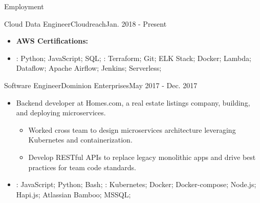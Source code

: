 \documentclass[]{mcdowellcv}
\begin{document}
\begin{cvsection}{Employment}
\begin{cvsubsection}{Cloud Data Engineer}{Cloudreach}{Jan. 2018 - Present}
\begin{itemize}
\begin{itemize}
                        \item \bf{AWS Certifications}: 
                    \end{itemize}
                \end{itemize}
            \begin{itemize}
                 \item {}: Python; JavaScript; SQL; \newline
                 : Terraform; Git; ELK Stack; Docker; Lambda; Dataflow; Apache Airflow; Jenkins; Serverless;
            \end{itemize}
        \end{cvsubsection}

        \begin{cvsubsection}{Software Engineer}{Dominion Enterprises}{May 2017 - Dec. 2017}
            \begin{itemize}
                \item Backend developer at Homes.com, a real estate listings company, building, and deploying microservices.
                \begin{itemize}
                    \item Worked cross team to design microservices architecture leveraging Kubernetes and containerization.
                    \item Develop RESTful APIs to replace legacy monolithic apps and drive best practices for team code standards.  
                \end{itemize}
            \end{itemize}
            \begin{itemize}
                 \item {}: JavaScript; Python; Bash;  \newline
                : Kubernetes; Docker; Docker-compose; Node.js; Hapi.js; Atlassian Bamboo; MSSQL;
            \end{itemize}
        \end{cvsubsection}


\end{cvsection}
\end{document}
